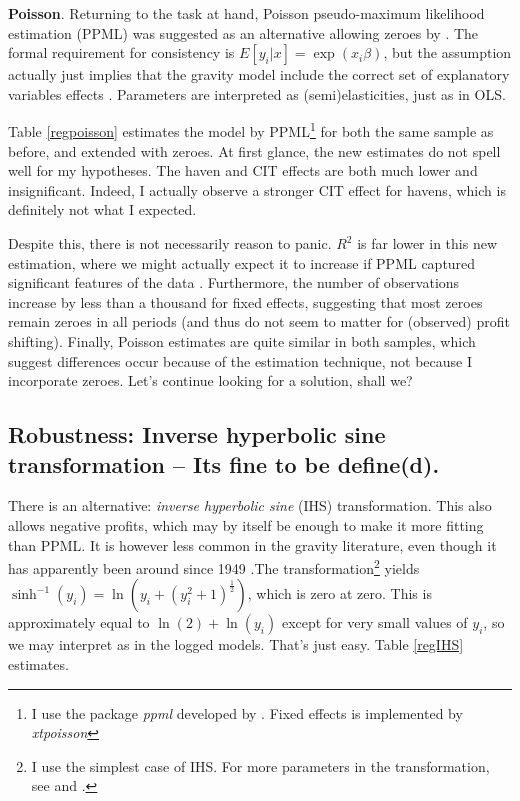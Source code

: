 \documentclass[twoside,a4paper,11pt]{article}
\begin{document}
\textbf{Poisson}. Returning to the task at hand, Poisson pseudo-maximum likelihood estimation (PPML) was suggested as an alternative allowing zeroes by \textcite{silva_log_2006}. The formal requirement for consistency is $ E[y_i|x]=\exp(x_i\beta) $, but the assumption actually just implies that the gravity model include the correct set of explanatory variables effects \autocite[52]{shepherd_gravity_2012}. Parameters are interpreted as (semi)elasticities, just as in OLS. 

Table \ref{regpoisson} estimates the model by PPML\footnote{I use the package \textit{ppml} developed by \textcite{silva_poisson:_2011}. Fixed effects is implemented by \textit{xtpoisson}} for both the same sample as before, and extended with zeroes. At first glance, the new estimates do not spell well for my hypotheses. The haven and CIT effects are both much lower and insignificant. Indeed, I actually observe a stronger CIT effect for havens, which is definitely not what I expected.

Despite this, there is not necessarily reason to panic. $ R^2 $ is far lower in this new estimation, where we might actually expect it to increase if PPML captured significant features of the data \autocite[53]{shepherd_gravity_2012}. Furthermore, the number of observations increase by less than a thousand for fixed effects, suggesting that most zeroes remain zeroes in all periods (and thus do not seem to matter for (observed) profit shifting). Finally, Poisson estimates are quite similar in both samples, which suggest differences occur because of the estimation technique, not because I incorporate zeroes. Let's continue looking for a solution, shall we?

\subsection{Robustness: Inverse hyperbolic sine transformation -- Its fine to be define(d).}\label{IHS}
There is an alternative: \textit{inverse hyperbolic sine} (IHS) transformation. This also allows negative profits, which may by itself be enough to make it more fitting than PPML. It is however less common in the gravity literature, even though it has apparently been around since 1949  \autocite{burbidge_alternative_1988}.The transformation\footnote{I use the simplest case of IHS. For more parameters in the transformation, see  \textcite{burbidge_alternative_1988} and  \textcite{mackinnon_transforming_1990}.}  yields $ \sinh^{-1}(y_i)=\ln(y_i+(y_i^2+1)^{\frac{1}{2}}) $, which is zero at zero. This is approximately equal to $ \ln(2)+\ln(y_i) $ except for very small values of $ y_i $, so we may interpret as in the logged models. That's just easy.  Table \ref{regIHS} estimates.
\end{document}

